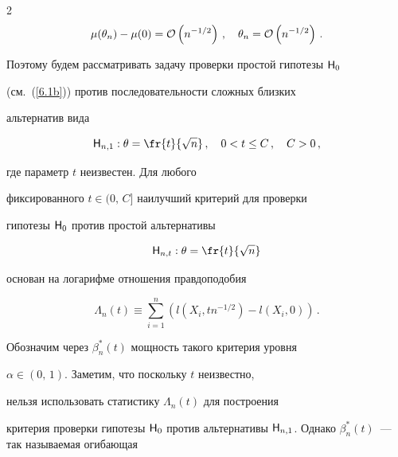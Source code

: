 \begin{multicols}{2}
\begin{equation*}


\mu(\theta_n)-\mu(0)= {\cal O}\left (n^{-1/2}\right )\,,\quad


\theta_n = {\cal O}\left (n^{-1/2}\right )\,.


\end{equation*}


Поэтому будем рассматривать задачу проверки прос\-той гипотезы ${\sf H}_0$


(см.~(\ref{6.1b})) против последовательности сложных близких


альтернатив вида


\begin{equation*}


{\sf H}_{n,1}: \theta = \fr{t}{\sqrt{n}}\,,\quad 0<t\le C\,,\quad


C>0\,, %


\end{equation*}


где параметр $t$ неизвестен. Для любого


фиксированного $t\in (0,\,C]$ наилучший критерий для проверки


гипотезы ${\sf H}_0$ против простой альтернативы


\begin{equation*}


{\sf H}_{n,t}:\theta = \fr{t}{\sqrt{n}}




\end{equation*}


 основан на логарифме отношения правдоподобия


\begin{equation}


\Lambda_n(t) \equiv \sum_{i=1}^{n}\left (


l(X_i,tn^{-1/2})-l(X_i,0)\right )\,.\label{6.15b}


\end{equation}


Обозначим через $\beta_n^*(t)$ мощность такого критерия уровня


$\alpha\in (0,\,1)$. Заметим, что поскольку $t$ неизвестно,


нельзя использовать статистику $\Lambda_n(t)$ для построения


критерия проверки гипотезы ${\sf H}_0$ против альтернативы ${\sf


H}_{n,1}$. Однако $\beta_n^*(t)$~--- так называемая огибающая



\end{multicols}
